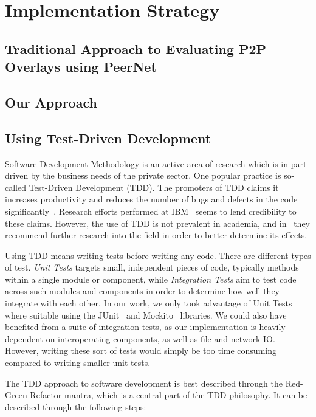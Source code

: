 \section{Implementation Strategy}

\subsection{Traditional Approach to Evaluating P2P Overlays using PeerNet}

\subsection{Our Approach}

\subsection{Using Test-Driven Development}

Software Development Methodology is an active area of research
which is in part driven by the business needs of the private
sector\cite{janzen2005test}. One popular practice is so-called Test-Driven
Development (TDD). The promoters of TDD claims it increases
productivity and reduces the number of bugs and defects in the
code significantly~\cite{beck2003test}. Research
efforts performed at IBM~\cite{maximilien2003assessing} seems to
lend credibility to these claims. However, the use of TDD is not
prevalent in academia, and in~\cite{janzen2005test} they
recommend further research into the field in order to better
determine its effects.

Using TDD means writing tests before writing any code. There are
different types of test. \emph{Unit Tests} targets small,
independent pieces of code, typically methods within a single
module or component, while \emph{Integration Tests} aim to test
code across such modules and components in order to determine
how well they integrate with each other. In our work, we only
took advantage of Unit Tests where suitable using the
JUnit~\cite{junit} and Mockito~\cite{mockito} libraries.
We could also have benefited from a suite of integration tests,
as our implementation is heavily dependent on interoperating
components, as well as file and network IO\@. However, writing
these sort of tests would simply be too time consuming compared
to writing smaller unit tests.

The TDD approach to software development is best described through the
Red-Green-Refactor mantra, which is a central part of the
TDD-philosophy. It can be described through the following steps:


